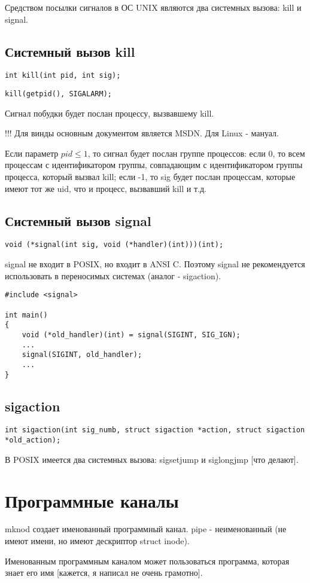 \documentclass[a4paper, 12pt]{report}
\begin{document}
	Средством посылки сигналов в ОС UNIX являются два системных вызова: kill и signal.
	
	\subsection*{Системный вызов kill}

	\begin{lstlisting}
int kill(int pid, int sig);
	\end{lstlisting}
	\begin{lstlisting}
kill(getpid(), SIGALARM);
	\end{lstlisting}
	
	Сигнал побудки будет послан процессу, вызвавшему kill.
	
	!!! Для винды основным документом является MSDN. Для Linux - мануал.
	
	Если параметр $pid \le 1$, то сигнал будет послан группе процессов: если 0, то всем процессам с идентификатором группы, совпадающим с идентификатором группы процесса, который вызвал kill; если -1, то sig будет послан процессам, которые имеют тот же uid, что и процесс, вызвавший kill и т.д.
	
	\subsection*{Системный вызов signal}
	
	\begin{lstlisting}
void (*signal(int sig, void (*handler)(int)))(int);
	\end{lstlisting}

	signal не входит в POSIX, но входит в ANSI C. Поэтому signal не рекомендуется использовать в переносимых системах (аналог - sigaction).
	
	\begin{lstlisting}
#include <signal>

int main()
{
	void (*old_handler)(int) = signal(SIGINT, SIG_IGN);
	...
	signal(SIGINT, old_handler);
	...
}
	\end{lstlisting}

	\subsection*{sigaction}
	
	\begin{lstlisting}
int sigaction(int sig_numb, struct sigaction *action, struct sigaction *old_action);
	\end{lstlisting}

	В POSIX имеется два системных вызова: sigsetjump и siglongjmp [что делают].
	
	\section*{Программные каналы}
	
	mknod создает именованный программный канал. pipe - неименованный (не имеют имени, но имеют дескриптор struct inode).
	
	Именованным программным каналом может пользоваться программа, которая знает его имя [кажется, я написал не очень грамотно].
\end{document}

